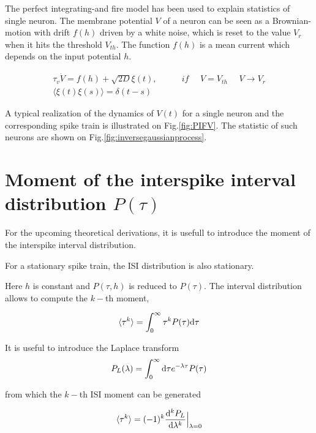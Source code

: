 \documentclass[12pt,twoside]{report}
\def \dd  {{\rm d}}
\begin{document}
The perfect integrating-and fire model has been used to explain statistics of single neuron. The membrane potential $V$ of a neuron can be seen as a Brownian-motion with drift $f(h)$ driven by a white noise, which is reset to the value $V_r$ when it hits the threshold $V_{th}$. The function $f(h)$ is a mean current which depends on the input potential $h$.

\begin{align}
\label{eq:Vxi}
\tau_v\dot V=f(h) +\sqrt{2D}\xi(t), \:\:\:\:\:\:\:\: \:\:\:\:\: if\:\:\:\:\:\:  V=V_{th}\:\:\:\:\:\:V\rightarrow V_r\\ 
\langle\xi(t)\xi(s)\rangle=\delta(t-s)
\end{align}

A typical realization of the dynamics of $V(t)$ for a single neuron and the corresponding spike train is illustrated on Fig.\ref{fig:PIFV}. The statistic of such neurons are shown on Fig.\ref{fig:inversegaussianprocess}.

\section{Moment of the interspike interval distribution $P(\tau)$}

For the upcoming theoretical derivations, it is usefull to introduce the moment of the interspike interval distribution.

For a stationary spike train, the ISI distribution is also stationary.

Here  $h$ is constant and $P(\tau,h)$ is reduced to $P(\tau)$. The interval distribution allows to compute the $k-$th moment,

\begin{equation}
\label{eq:Pmoment}
\langle\tau^k\rangle=\int_0^\infty \tau^kP(\tau)\dd\tau
\end{equation}

It is useful to introduce the Laplace transform
\begin{equation}
\label{eq:Plaplace}
P_L(\lambda)=\int_0^\infty\dd\tau e^{-\lambda \tau}P(\tau)
\end{equation}

from which the  $k-$th ISI moment can be generated

\begin{equation}
\label{eq:Pmoment2}
\langle\tau^k\rangle=(-1)^k\frac{\dd^k P_L}{\dd \lambda^k}\Bigr|_{\lambda=0}
\end{equation}
\end{document}

